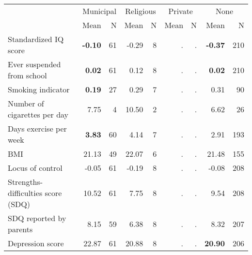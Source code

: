 \begin{tabular}{l r r r r r r r r}
\toprule
& \multicolumn{2}{c}{Municipal} & \multicolumn{2}{c}{Religious} & \multicolumn{2}{c}{Private} & \multicolumn{2}{c}{None} \\
& \scriptsize Mean & \scriptsize N & \scriptsize Mean & \scriptsize N & \scriptsize Mean & \scriptsize N & \scriptsize Mean & \scriptsize N \\
\midrule
Standardized IQ score & \textbf{    -0.10} &        61 &     -0.29 &         8 &         . & . & \textbf{    -0.37} &       210 \\
Ever suspended from school & \textbf{     0.02} &        61 &      0.12 &         8 &         . & . & \textbf{     0.02} &       210 \\
Smoking indicator & \textbf{     0.19} &        27 &      0.29 &         7 &         . & . &      0.31 &        90 \\
Number of cigarettes per day &      7.75 &         4 &     10.50 &         2 &         . & . &      6.62 &        26 \\
Days exercise per week & \textbf{     3.83} &        60 &      4.14 &         7 &         . & . &      2.91 &       193 \\
BMI &     21.13 &        49 &     22.07 &         6 &         . & . &     21.48 &       155 \\
Locus of control &     -0.05 &        61 &     -0.19 &         8 &         . & . &     -0.08 &       208 \\
Strengths-difficulties score (SDQ) &     10.52 &        61 &      7.75 &         8 &         . & . &      9.54 &       208 \\
SDQ reported by parents &      8.15 &        59 &      6.38 &         8 &         . & . &      8.32 &       207 \\
Depression score &     22.87 &        61 &     20.88 &         8 &         . & . & \textbf{    20.90} &       206 \\
\bottomrule
\end{tabular}
